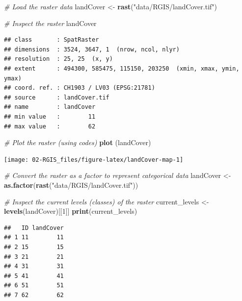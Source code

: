\documentclass[
]{article}
\newenvironment{Shaded}{\begin{snugshade}}{\end{snugshade}}
\newcommand{\CommentTok}[1]{\textcolor[rgb]{0.56,0.35,0.01}{\textit{#1}}}
\newcommand{\DecValTok}[1]{\textcolor[rgb]{0.00,0.00,0.81}{#1}}
\newcommand{\FunctionTok}[1]{\textcolor[rgb]{0.13,0.29,0.53}{\textbf{#1}}}
\newcommand{\NormalTok}[1]{#1}
\newcommand{\OtherTok}[1]{\textcolor[rgb]{0.56,0.35,0.01}{#1}}
\newcommand{\StringTok}[1]{\textcolor[rgb]{0.31,0.60,0.02}{#1}}
\begin{document}
\begin{Shaded}
\begin{Highlighting}[]
\CommentTok{\# Load the raster data}
\NormalTok{landCover }\OtherTok{\textless{}{-}} \FunctionTok{rast}\NormalTok{(}\StringTok{"data/RGIS/landCover.tif"}\NormalTok{)}

\CommentTok{\# Inspect the raster}
\NormalTok{landCover}
\end{Highlighting}
\end{Shaded}

\begin{verbatim}
## class       : SpatRaster 
## dimensions  : 3524, 3647, 1  (nrow, ncol, nlyr)
## resolution  : 25, 25  (x, y)
## extent      : 494300, 585475, 115150, 203250  (xmin, xmax, ymin, ymax)
## coord. ref. : CH1903 / LV03 (EPSG:21781) 
## source      : landCover.tif 
## name        : landCover 
## min value   :        11 
## max value   :        62
\end{verbatim}

\begin{Shaded}
\begin{Highlighting}[]
\CommentTok{\# Plot the raster (using codes)}
\FunctionTok{plot}\NormalTok{ (landCover)}
\end{Highlighting}
\end{Shaded}

\begin{center}\texttt{[image: 02-RGIS\_files/figure-latex/landCover-map-1]} \end{center}

\begin{Shaded}
\begin{Highlighting}[]
\CommentTok{\# Convert the raster as a factor to represent categorical data}
\NormalTok{landCover }\OtherTok{\textless{}{-}} \FunctionTok{as.factor}\NormalTok{(}\FunctionTok{rast}\NormalTok{(}\StringTok{"data/RGIS/landCover.tif"}\NormalTok{))}

\CommentTok{\# Inspect the current levels (classes) of the raster}
\NormalTok{current\_levels }\OtherTok{\textless{}{-}} \FunctionTok{levels}\NormalTok{(landCover)[[}\DecValTok{1}\NormalTok{]]}
\FunctionTok{print}\NormalTok{(current\_levels)}
\end{Highlighting}
\end{Shaded}

\begin{verbatim}
##   ID landCover
## 1 11        11
## 2 15        15
## 3 21        21
## 4 31        31
## 5 41        41
## 6 51        51
## 7 62        62
\end{verbatim}
\end{document}
